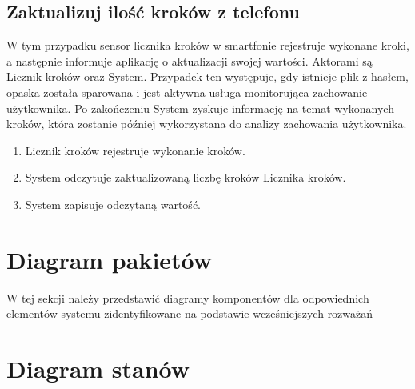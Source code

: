 \subsection{Zaktualizuj ilość kroków z telefonu}
W tym przypadku sensor licznika kroków w smartfonie rejestruje wykonane kroki, a następnie informuje aplikację o aktualizacji swojej wartości. Aktorami są Licznik kroków oraz System. Przypadek ten występuje, gdy istnieje plik z hasłem, opaska została sparowana i jest aktywna usługa monitorująca zachowanie użytkownika. Po zakończeniu System zyskuje informację na temat wykonanych kroków, która zostanie później wykorzystana do analizy zachowania użytkownika.
\begin{enumerate}
    \item Licznik kroków rejestruje wykonanie kroków.
    \item System odczytuje zaktualizowaną liczbę kroków Licznika kroków.
    \item System zapisuje odczytaną wartość.
\end{enumerate}

\section{Diagram pakietów}

W tej sekcji należy przedstawić diagramy komponentów dla odpowiednich elementów systemu zidentyfikowane na podstawie wcześniejszych rozważań

\section{Diagram stanów}

